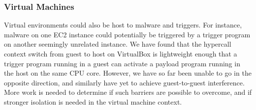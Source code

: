 

\subsubsection{Virtual Machines}
Virtual environments could also be host to \speculake malware and triggers. For
instance, malware on one EC2 instance could potentially be triggered by a
trigger program on another seemingly unrelated instance. We have found that the
hypercall context switch from guest to host on VirtualBox is lightweight enough
that a trigger program running in a guest can activate a payload program running
in the host on the same CPU core. However, we have so far been unable to go in
the opposite direction, and similarly have yet to achieve guest-to-guest
interference. More work is needed to determine if such barriers are possible to
overcome, and if stronger isolation is needed in the virtual machine context.

